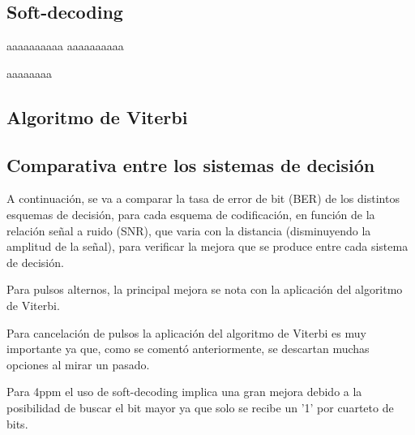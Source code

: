 \subsection{Soft-decoding}
aaaaaaaaaa
aaaaaaaaaa

aaaaaaaa
\subsection{Algoritmo de Viterbi}


\subsection{Comparativa entre los sistemas de decisión}
A continuación, se va a comparar la tasa de error de bit (BER) de los distintos esquemas de decisión, para cada esquema 
de codificación, en función de la relación señal a ruido (SNR), que varia con la distancia (disminuyendo la 
amplitud de la señal), para verificar la mejora que se produce entre cada sistema de decisión.

Para pulsos alternos, la principal mejora se nota con la aplicación del algoritmo de Viterbi.

Para cancelación de pulsos la aplicación del algoritmo de Viterbi es muy importante ya que, como se comentó anteriormente,
se descartan muchas opciones al mirar un pasado.

Para 4ppm el uso de soft-decoding implica una gran mejora debido a la posibilidad de buscar el bit mayor ya que solo 
se recibe un '1' por cuarteto de bits.




\chapterend{}
